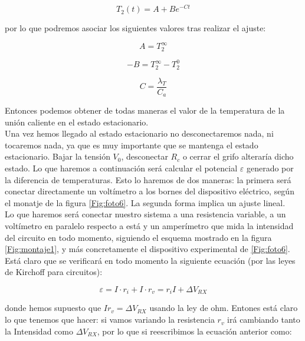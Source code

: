 \documentclass[12pt,a4paper]{article}
\begin{document}
\begin{equation}
T_2(t) = A + B e^{-Ct}
\label{Ec:regresionexponecial}
\end{equation}

por lo que podremos asociar los siguientes valores tras realizar el ajuste:


\begin{equation}
A = T_2^{\infty}
\end{equation}

\begin{equation}
- B = T_2^{\infty} - T_2^0
\end{equation}

\begin{equation}
C = \frac{\lambda_T}{C_a} 
\label{Ec:asociaciondeC}
\end{equation}

Entonces podemos obtener de todas maneras el valor de la temperatura de la unión caliente en el estado estacionario. \\

Una vez hemos llegado al estado estacionario no desconectaremos nada, ni tocaremos nada, ya que es muy importante que se mantenga el estado estacionario. Bajar la tensión $V_0$, desconectar $R_c$ o cerrar el grifo alteraría dicho estado. Lo que haremos a continuación será calcular el potencial $\varepsilon$ generado por la diferencia de temperaturas. Esto lo haremos de dos maneras: la primera será conectar directamente un voltímetro a los bornes del dispositivo eléctrico, según el monatje de la figura \ref{Fig:foto6}. La segunda forma implica un ajuste lineal. \\

Lo que haremos será conectar nuestro sistema a una resistencia variable, a un voltímetro en paralelo respecto a está y un amperímetro que mida la intensidad del circuito en todo momento, siguiendo el esquema mostrado en la figura \ref{Fig:montaje1}, y más concretamente el dispositivo experimental de \ref{Fig:foto6}. Está claro que se verificará en todo momento la siguiente ecuación (por las leyes de Kirchoff para circuitos):

\begin{equation}
\varepsilon = I \cdot r_i + I \cdot r_{v} = r_i I + \Delta V_{RX}
\end{equation}

donde hemos supuesto que $I r_{v} = \Delta V_{RX}$ usando la ley de ohm. Entones está claro lo que tenemos que hacer: si vamos variando la resistencia $r_{v}$ irá cambiando tanto la Intensidad como $\Delta V_{RX}$, por lo que si reescribimos la ecuación anterior como:
\end{document}
